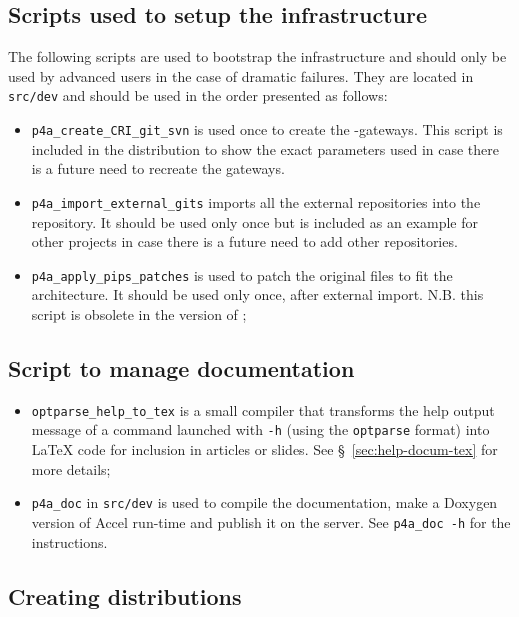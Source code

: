 \documentclass[a4paper]{article}
\begin{document}
\subsection{Scripts used to setup the infrastructure}
\label{sec:scripts-used-setup}

The following scripts are used to
bootstrap the \Apfa infrastructure and should only be used by advanced
users in the case of dramatic failures.
They are located in
\texttt{src/dev} and should be used in the order presented as follows:
\begin{itemize}
\item \verb/p4a_create_CRI_git_svn/ is used once to create the \Apips{}
  \Asvn-\Agit gateways. This script is included in the distribution to
  show the exact parameters used in case there is a future need
  to recreate the gateways.
\item \verb/p4a_import_external_gits/ imports all the external \Agit
  repositories into the \Apfa{} \Agit repository. It should be used only
  once but is included as an example for other projects in case there is
  a future need to add other repositories.
\item \verb/p4a_apply_pips_patches/ is used to patch the original \Apips
  files to fit the \Apfa architecture. It should be used only once, after
  external \Agit import. N.B. this script is obsolete in the
  \Aautotools version of \Apips;
\end{itemize}

\subsection{Script to manage documentation}
\label{sec:script-deal-with}

\begin{itemize}
\item \verb|optparse_help_to_tex| is a small compiler that transforms the
  help output message of a command launched with \texttt{-h} (using
  the \texttt{optparse} format) into La\TeX{} code for inclusion
  in articles or slides. See \S~\ref{sec:help-docum-tex} for more details;
\item \verb|p4a_doc| in \verb|src/dev| is used to compile the \Apfa
  documentation, make a Doxygen version of \Apfa Accel run-time and
  publish it on the server. See \texttt{p4a\_doc -h} for the instructions.
\end{itemize}


\subsection{Creating distributions}
\label{sec:making-distributions}
\end{document}
